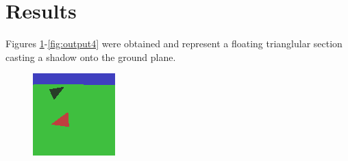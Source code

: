 \documentclass{article}
\begin{document}
\section{Results}
Figures \ref{fig:output1}-\ref{fig:output4} were obtained and represent a floating trianglular section casting a shadow onto the 
ground plane.
\begin{multicols}{2}


\begin{figure}
\centering
\includegraphics[width=\linewidth]{./imgs/output1}
\caption{}
\label{fig:output1}
\end{figure}


\end{multicols}
\end{document}
